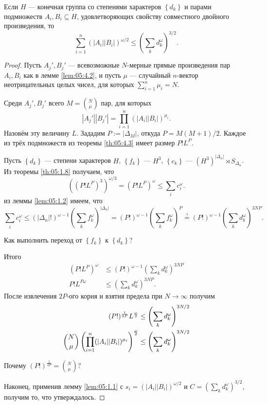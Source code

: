 \begin{theorem}\label{th:05:4.4}
  Если $H$ --- конечная группа со степенями характеров $\left\{ d_k \right\}$ и парами подмножеств $A_i, B_i \subseteq H$, удовлетворяющих свойству совместного двойного произведения, то
  \[
  	\sum\limits_{i=1}^{n} (|A_i||B_i|)^{\omega/2} \leq \left( \sum\limits_{k} d_k^\omega  \right)^{3/2}.
  \]
\end{theorem}
\begin{proof}
	Пусть $A_j', B_j'$ --- всевозможные $N$-мерные прямые произведения пар $A_i, B_i$ как в лемме \ref{lem:05:4.2}, и пусть $\mu$ --- случайный $n$-вектор неотрицательных целых чисел, для которых $\sum_{i=1}^{n} \mu_i = N$.

	Среди $A_j', B_j'$ всего $M = \binom{N}{\mu}$ пар, для которых 
	\[
		|A_j'||B_j'| = \prod\limits_{i=1}^n (|A_i||B_i|)^{\mu_i}.
	\]
	Назовём эту величину $L$. Зададим $P:=|\Delta_M|$, откуда $P=M(M+1)/2$. Каждое из трёх подмножеств из теоремы \ref{th:05:4.3} имеет размер $P!L^P$.

	Пусть $\left\{ d_k \right\}$ --- степени характеров $H$, $\left\{ f_k \right\}$ --- $H^3$, $\left\{ c_k \right\}$ --- $(H^3)^{|\Delta_n|} \rtimes S_{\Delta_n}$. Из теоремы \ref{th:05:1.8} получаем, что
	\[
		((P!L^P)^3)^{\omega/3} = (P!L^P)^\omega \leq \sum_i c_i^\omega.
	\]
	из леммы \ref{lem:05:1.2} имеем, что
	\[
		\sum_i c_i^\omega \leq (|\Delta_n|!)^{\omega-1} \left( \sum_k f_k^\omega \right)^{|\Delta_n|} = (P!)^{\omega-1}\left( \sum_k f_k^\omega \right)^{P} \overset{?}{=} (P!)^{\omega-1}\left( \sum_k d_k^\omega \right)^{3NP}.
	\]
	\begin{question}
	  Как выполнить переход от $\left\{ f_k \right\}$ к $\left\{ d_k \right\}$?
	\end{question}
	Итого
	\begin{align*}
		(P!L^P)^{\omega} & \leq (P!)^{\omega-1}\left( \sum_k d_k^\omega \right)^{3NP}\\
		P!L^{P \omega} & \leq \left( \sum_k d_k^\omega \right)^{3NP}.
	\end{align*}
	После извлечения $2P$-ого корня и взятия предела при $N \to \infty$ получим
	\begin{align*}
	  (P!)^{\frac{1}{2P}} L^{\frac{\omega}{2}} & \leq  \left( \sum_k d_k^\omega \right)^{3N/2}\\
	  \dbinom{N}{\mu} \left( \prod\limits_{i=1}^n (|A_i||B_i|)^{\mu_i} \right)^{\frac{\omega}{2}} & \leq \left( \sum_k d_k^\omega \right)^{3N/2}
	\end{align*}
	\begin{question}
	  Почему $\left( P! \right)^{\frac{1}{2P}} = \binom{N}{\mu}$?
	\end{question}
	Наконец, применив лемму \ref{lem:05:1.1} с $s_i = \left( |A_i| |B_i| \right)^{\omega/2}$ и $C=\left( \sum_k d_k^\omega \right)^{3/2}$, получим то, что утверждалось. 
\end{proof}

